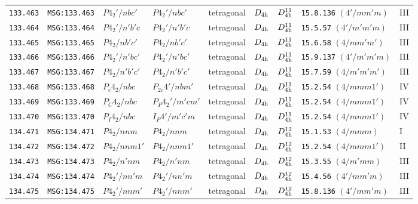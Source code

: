 \documentclass[fleqn,10pt]{jsarticle}
\begin{document}
\begin{center}
\begin{longtable}{lllllllll}
\texttt{133.463} & \texttt{MSG:133.463} & $P4_{2}'/nbc'$ & $P4_{2}'/nbc'$ & tetragonal & $D_{\rm 4h}$ & $D_{\rm 4h}^{11}$ & \texttt{15.8.136} $(4'/mm'm)$ & III \\
\texttt{133.464} & \texttt{MSG:133.464} & $P4_{2}'/n'b'c$ & $P4_{2}'/n'b'c$ & tetragonal & $D_{\rm 4h}$ & $D_{\rm 4h}^{11}$ & \texttt{15.5.57} $(4'/m'm'm)$ & III \\
\texttt{133.465} & \texttt{MSG:133.465} & $P4_{2}/nb'c'$ & $P4_{2}/nb'c'$ & tetragonal & $D_{\rm 4h}$ & $D_{\rm 4h}^{11}$ & \texttt{15.6.58} $(4/mm'm')$ & III \\
\texttt{133.466} & \texttt{MSG:133.466} & $P4_{2}'/n'bc'$ & $P4_{2}'/n'bc'$ & tetragonal & $D_{\rm 4h}$ & $D_{\rm 4h}^{11}$ & \texttt{15.9.137} $(4'/m'm'm)$ & III \\
\texttt{133.467} & \texttt{MSG:133.467} & $P4_{2}/n'b'c'$ & $P4_{2}/n'b'c'$ & tetragonal & $D_{\rm 4h}$ & $D_{\rm 4h}^{11}$ & \texttt{15.7.59} $(4/m'm'm')$ & III \\
\texttt{133.468} & \texttt{MSG:133.468} & $P_{c}4_{2}/nbc$ & $P_{2c}4'/nbm'$ & tetragonal & $D_{\rm 4h}$ & $D_{\rm 4h}^{11}$ & \texttt{15.2.54} $(4/mmm1')$ & IV \\
\texttt{133.469} & \texttt{MSG:133.469} & $P_{C}4_{2}/nbc$ & $P_{P}4_{2}'/m'cm'$ & tetragonal & $D_{\rm 4h}$ & $D_{\rm 4h}^{11}$ & \texttt{15.2.54} $(4/mmm1')$ & IV \\
\texttt{133.470} & \texttt{MSG:133.470} & $P_{I}4_{2}/nbc$ & $I_{P}4'/m'c'm$ & tetragonal & $D_{\rm 4h}$ & $D_{\rm 4h}^{11}$ & \texttt{15.2.54} $(4/mmm1')$ & IV \\ \hline
\texttt{134.471} & \texttt{MSG:134.471} & $P4_{2}/nnm$ & $P4_{2}/nnm$ & tetragonal & $D_{\rm 4h}$ & $D_{\rm 4h}^{12}$ & \texttt{15.1.53} $(4/mmm)$ & I \\
\texttt{134.472} & \texttt{MSG:134.472} & $P4_{2}/nnm1'$ & $P4_{2}/nnm1'$ & tetragonal & $D_{\rm 4h}$ & $D_{\rm 4h}^{12}$ & \texttt{15.2.54} $(4/mmm1')$ & II \\
\texttt{134.473} & \texttt{MSG:134.473} & $P4_{2}/n'nm$ & $P4_{2}/n'nm$ & tetragonal & $D_{\rm 4h}$ & $D_{\rm 4h}^{12}$ & \texttt{15.3.55} $(4/m'mm)$ & III \\
\texttt{134.474} & \texttt{MSG:134.474} & $P4_{2}'/nn'm$ & $P4_{2}'/nn'm$ & tetragonal & $D_{\rm 4h}$ & $D_{\rm 4h}^{12}$ & \texttt{15.4.56} $(4'/mm'm)$ & III \\
\texttt{134.475} & \texttt{MSG:134.475} & $P4_{2}'/nnm'$ & $P4_{2}'/nnm'$ & tetragonal & $D_{\rm 4h}$ & $D_{\rm 4h}^{12}$ & \texttt{15.8.136} $(4'/mm'm)$ & III \\

\end{longtable}
\end{center}
\end{document}
